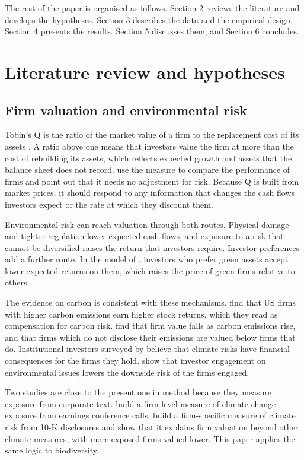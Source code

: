 \documentclass[12pt,a4paper]{article}
\begin{document}
The rest of the paper is organised as follows. Section 2 reviews the literature and develops the hypotheses. Section 3 describes the data and the empirical design. Section 4 presents the results. Section 5 discusses them, and Section 6 concludes.

\section{Literature review and hypotheses}

\subsection{Firm valuation and environmental risk}

Tobin's Q is the ratio of the market value of a firm to the replacement cost of its assets \citep{tobin1969}. A ratio above one means that investors value the firm at more than the cost of rebuilding its assets, which reflects expected growth and assets that the balance sheet does not record. \citet{lang1994} use the measure to compare the performance of firms and point out that it needs no adjustment for risk. Because Q is built from market prices, it should respond to any information that changes the cash flows investors expect or the rate at which they discount them.

Environmental risk can reach valuation through both routes. Physical damage and tighter regulation lower expected cash flows, and exposure to a risk that cannot be diversified raises the return that investors require. Investor preferences add a further route. In the model of \citet{pastor2021}, investors who prefer green assets accept lower expected returns on them, which raises the price of green firms relative to others.

The evidence on carbon is consistent with these mechanisms. \citet{bolton2021} find that US firms with higher carbon emissions earn higher stock returns, which they read as compensation for carbon risk. \citet{matsumura2014} find that firm value falls as carbon emissions rise, and that firms which do not disclose their emissions are valued below firms that do. Institutional investors surveyed by \citet{krueger2020} believe that climate risks have financial consequences for the firms they hold. \citet{hoepner2024} show that investor engagement on environmental issues lowers the downside risk of the firms engaged.

Two studies are close to the present one in method because they measure exposure from corporate text. \citet{sautner2023} build a firm-level measure of climate change exposure from earnings conference calls. \citet{berkman2024} build a firm-specific measure of climate risk from 10-K disclosures and show that it explains firm valuation beyond other climate measures, with more exposed firms valued lower. This paper applies the same logic to biodiversity.
\end{document}
